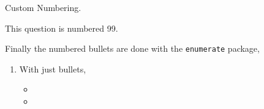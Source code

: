 \documentclass{../src/homework}
\begin{document}
\begin{question}[99] Custom Numbering.

  This question is numbered 99.
\end{question}

\begin{question}
Finally the numbered bullets are done with the \texttt{enumerate} package,

\begin{enumerate}
  \item With just bullets,
  \begin{itemize}
    \item {}
    \item {}
  \end{itemize}
\end{enumerate}
\end{question}


 

\end{document}
